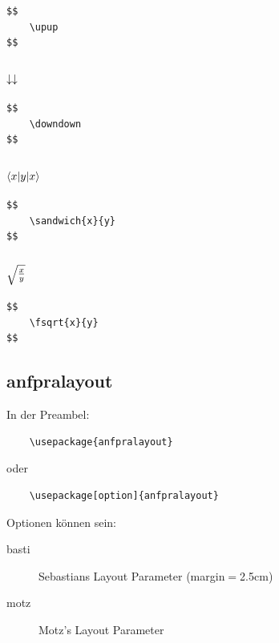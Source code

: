 \documentclass[a4paper]{article}
\begin{document}
\begin{verbatim}
$$
	\upup
$$
\end{verbatim}

\subsubsection{$ \downarrow \downarrow$}

\begin{verbatim}
$$
	\downdown
$$
\end{verbatim}

\subsubsection{$  \langle x| y  |x\rangle$}

\begin{verbatim}
$$
	\sandwich{x}{y}
$$
\end{verbatim}

\subsubsection{$ \sqrt{\frac{x}{y}}$}

\begin{verbatim}
$$
	\fsqrt{x}{y}
$$
\end{verbatim}



\subsection{anfpralayout}

In der Preambel:

\begin{verbatim}
	\usepackage{anfpralayout}
\end{verbatim}

oder

\begin{verbatim}
	\usepackage[option]{anfpralayout}
\end{verbatim}

Optionen können sein:

\begin{description}
	\item[basti] Sebastians Layout Parameter (margin$=$2.5cm)
	\item[motz] Motz's Layout Parameter
\end{description}
\end{document}
